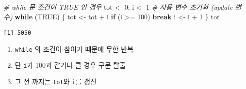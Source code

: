 \documentclass[
  11pt,
]{krantz}
\makeatletter
\newenvironment{Shaded}{\begin{snugshade}}{\end{snugshade}}
\newcommand{\CommentTok}[1]{\textcolor[rgb]{0.37,0.37,0.37}{\textit{#1}}}
\newcommand{\ConstantTok}[1]{\textcolor[rgb]{0,0,0}{#1}}
\newcommand{\ControlFlowTok}[1]{\textcolor[rgb]{0.27,0.27,0.27}{\textbf{#1}}}
\newcommand{\DecValTok}[1]{\textcolor[rgb]{0.06,0.06,0.06}{#1}}
\newcommand{\NormalTok}[1]{#1}
\newcommand{\OtherTok}[1]{\textcolor[rgb]{0.37,0.37,0.37}{#1}}
\newcommand{\SpecialCharTok}[1]{\textcolor[rgb]{0,0,0}{#1}}
\providecommand{\tightlist}{%
  \setlength{\itemsep}{0pt}\setlength{\parskip}{0pt}}
\newenvironment{kframe}{%
\medskip{}
\setlength{\fboxsep}{.8em}
 \def\at@end@of@kframe{}%
 \ifinner\ifhmode%
  \def\at@end@of@kframe{\end{minipage}}%
  \begin{minipage}{\columnwidth}%
 \fi\fi%
 \def\FrameCommand##1{\hskip\@totalleftmargin \hskip-\fboxsep
 \colorbox{shadecolor}{##1}\hskip-\fboxsep
     \hskip-\linewidth \hskip-\@totalleftmargin \hskip\columnwidth}%
 \MakeFramed {\advance\hsize-\width
   \@totalleftmargin\z@ \linewidth\hsize
   \@setminipage}}%
 {\par\unskip\endMakeFramed%
 \at@end@of@kframe}
\renewenvironment{quote}{\begin{kframe}}{\end{kframe}}
\makeatother
\begin{document}
\footnotesize

\begin{Shaded}
\begin{Highlighting}[]
\CommentTok{\# while 문 조건이 TRUE 인 경우}
\NormalTok{tot }\OtherTok{\textless{}{-}} \DecValTok{0}\NormalTok{; i }\OtherTok{\textless{}{-}} \DecValTok{1} \CommentTok{\# 사용 변수 초기화 (update 변수)}
\ControlFlowTok{while}\NormalTok{ (}\ConstantTok{TRUE}\NormalTok{) \{}
\NormalTok{  tot }\OtherTok{\textless{}{-}}\NormalTok{ tot }\SpecialCharTok{+}\NormalTok{ i}
  \ControlFlowTok{if}\NormalTok{ (i }\SpecialCharTok{\textgreater{}=} \DecValTok{100}\NormalTok{) }\ControlFlowTok{break}
\NormalTok{  i }\OtherTok{\textless{}{-}}\NormalTok{ i }\SpecialCharTok{+} \DecValTok{1}
\NormalTok{\}}
\NormalTok{tot}
\end{Highlighting}
\end{Shaded}

\begin{verbatim}
[1] 5050
\end{verbatim}

\normalsize

\begin{quote}
\begin{enumerate}
\def\labelenumi{\arabic{enumi}.}
\tightlist
\item
  \texttt{while} 의 조건이 참이기 때문에 무한 반복
\item
  단 \texttt{i}가 100과 같거나 클 경우 구문 탈출
\item
  그 전 까지는 \texttt{tot}와 \texttt{i}를 갱신
\end{enumerate}
\end{quote}

\footnotesize
\end{document}
